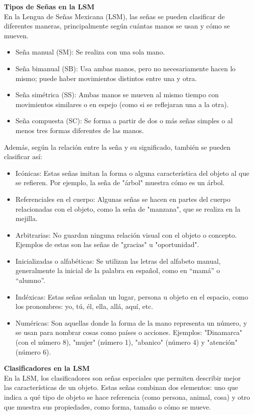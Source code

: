 \textbf{Tipos de Señas en la LSM}\\
En la Lengua de Señas Mexicana (LSM), las señas se pueden clasificar de diferentes maneras, principalmente según cuántas manos se usan y cómo se mueven.

\begin{itemize}
    \item Seña manual (SM): Se realiza con una sola mano.
    \item Seña bimanual (SB): Usa ambas manos, pero no necesariamente hacen lo mismo; puede haber movimientos distintos entre una y otra.
    \item Seña simétrica (SS): Ambas manos se mueven al mismo tiempo con movimientos similares o en espejo (como si se reflejaran una a la otra).
    \item Seña compuesta (SC): Se forma a partir de dos o más señas simples o al menos tres formas diferentes de las manos.
\end{itemize}

\newpage
Además, según la relación entre la seña y su significado, también se pueden clasificar así:
\begin{itemize}
    \item Icónicas: Estas señas imitan la forma o alguna característica del objeto al que se refieren. Por ejemplo, la seña de "árbol" muestra cómo es un árbol.
    \item Referenciales en el cuerpo: Algunas señas se hacen en partes del cuerpo relacionadas con el objeto, como la seña de "manzana", que se realiza en la mejilla.
    \item Arbitrarias: No guardan ninguna relación visual con el objeto o concepto. Ejemplos de estas son las señas de "gracias" u "oportunidad".
    \item Inicializadas o alfabéticas: Se utilizan las letras del alfabeto manual, generalmente la inicial de la palabra en español, como en “mamá” o “alumno”.
    \item Indéxicas: Estas señas señalan un lugar, persona u objeto en el espacio, como los pronombres: yo, tú, él, ella, allá, aquí, etc.
    \item Numéricas: Son aquellas donde la forma de la mano representa un número, y se usan para nombrar cosas como países o acciones. Ejemplos: "Dinamarca" (con el número 8), "mujer" (número 1), "abanico" (número 4) y "atención" (número 6).\\
\end{itemize}

\textbf{Clasificadores en la LSM}\\
En la LSM, los clasificadores son señas especiales que permiten describir mejor las características de un objeto. Estas señas combinan dos elementos: uno que indica a qué tipo de objeto se hace referencia (como persona, animal, cosa) y otro que muestra sus propiedades, como forma, tamaño o cómo se mueve.\\

